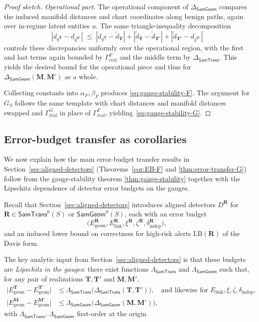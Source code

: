 \documentclass[11pt]{article}
\newcommand{\SamTrans}{\mathsf{SamTrans}}
\newcommand{\SamGeom}{\mathsf{SamGeom}}
\begin{document}
\begin{proof}[Proof sketch]
\emph{Operational part.}
The operational component of $\Delta_{\SamGeom}$ compares the induced
manifold distances and chart coordinates along benign paths, again over
in-regime latent entities $u$. The same triangle-inequality decomposition
\[
| d_{g^{\mathbf{T}}} - d_{g^{\mathbf{T}'}} |
\;\le\;
| d_{g^{\mathbf{T}}} - \tilde d_{\mathbf{T}} |
+ | \tilde d_{\mathbf{T}} - \tilde d_{\mathbf{T}'} |
+ | \tilde d_{\mathbf{T}'} - d_{g^{\mathbf{T}'}} |
\]
controls these discrepancies uniformly over the operational region, with
the first and last terms again bounded by $\Gamma_{\mathrm{real}}^{F}$
and the middle term by $\Delta_{\SamTrans}$.
This yields the desired bound for the operational piece and thus for
$\Delta_{\SamGeom}(\mathbf{M},\mathbf{M}')$ as a whole.

Collecting constants into $\alpha_F,\beta_F$ produces
\eqref{eq:gauge-stability-F}. The argument for $G_S$ follows the same
template with chart distances and manifold distances swapped and 
$\Gamma_{\mathrm{real}}^{G}$ in place of $\Gamma_{\mathrm{real}}^{F}$,
yielding~\eqref{eq:gauge-stability-G}. \qedhere
\end{proof}

\subsection{Error-budget transfer as corollaries}
\label{subsec:error-budget-corollaries}

We now explain how the main error-budget transfer results in
Section~\ref{sec:aligned-detectors} (Theorems~\ref{cor:EB-F} and
\ref{thm:error-transfer-G}) follow from the gauge-stability theorem
\ref{thm:gauge-stability} together with the Lipschitz dependence of
detector error budgets on the gauges.

Recall that Section~\ref{sec:aligned-detectors} introduces aligned
detectors $D^{\mathbf{R}}$ for $\mathbf{R} \in \SamTrans^0(S)$ or
$\SamGeom^0(S)$, each with an error budget
\[
\bigl(E_{\mathrm{geom}}^{\mathbf{R}},
      E_{\mathrm{link}}^{\mathbf{R}},
      \xi^{\mathbf{R}},
      \zeta^{\mathbf{R}},
      \delta_{\mathrm{indep}}^{\mathbf{R}}\bigr),
\]
and an induced lower bound on correctness for high-risk alerts
$\mathrm{LB}(\mathbf{R})$ of the Davis form.

The key analytic input from Section~\ref{sec:aligned-detectors} is that
these budgets are \emph{Lipschitz in the gauges}: there exist functions
$\Lambda_{\SamTrans}$ and $\Lambda_{\SamGeom}$ such that, for any pair
of realizations $\mathbf{T},\mathbf{T}'$ and $\mathbf{M},\mathbf{M}'$,
\begin{align}
\bigl|
E_{\mathrm{geom}}^{\mathbf{T}} - E_{\mathrm{geom}}^{\mathbf{T}'}
\bigr|
&\le \Lambda_{\SamTrans}\bigl(
\Delta_{\SamTrans}(\mathbf{T},\mathbf{T}')
\bigr),
\quad\text{and likewise for } E_{\mathrm{link}},\xi,\zeta,\delta_{\mathrm{indep}},
\label{eq:EB-Lip-trans}
\\
\bigl|
E_{\mathrm{geom}}^{\mathbf{M}} - E_{\mathrm{geom}}^{\mathbf{M}'}
\bigr|
&\le \Lambda_{\SamGeom}\bigl(
\Delta_{\SamGeom}(\mathbf{M},\mathbf{M}')
\bigr),
\label{eq:EB-Lip-geom}
\end{align}
with $\Lambda_{\SamTrans}$, $\Lambda_{\SamGeom}$ first-order at the
origin.
\end{document}
